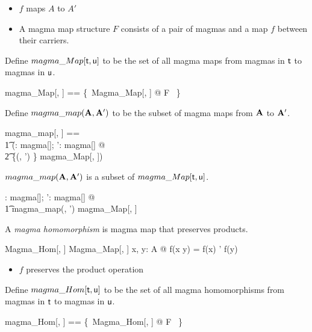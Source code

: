 \documentclass{amsart}
\begin{document}
\begin{itemize}
	\item $f$ maps $A$ to $A'$
	\item A magma map structure $F$ consists of a pair of magmas and a map $f$ between their carriers.
\end{itemize}

Define $magma\_Map[\mathsf{t}, \mathsf{u}]$ to be the set of all magma maps
from magmas in $\mathsf{t}$ to magmas in $\mathsf{u}$.

\begin{zed}
	magma\_Map[\genT, \genU] == \{~Magma\_Map[\genT, \genU] @ F ~\}
\end{zed}

Define $magma\_map(\mathbf{A}, \mathbf{A}')$ to be the subset of magma maps 
from $\mathbf{A}$ to $\mathbf{A}'$.

\begin{zed}
	magma\_map[\genT, \genU] == \\
	\t1	(\lambda \strucA: magma[\genT]; \strucA': magma[\genU] @ \\
	\t2		\{(\strucA, \strucA') \} \dres magma\_Map[\genT, \genU])
\end{zed}

\begin{remark} $magma\_map(\mathbf{A}, \mathbf{A}')$ is a subset of $magma\_Map[\mathsf{t}, \mathsf{u}]$.

\begin{zed}
	\forall \strucA: magma[\setT]; \strucA': magma[\setU] @ \\
	\t1	magma\_map(\strucA, \strucA') \subseteq magma\_Map[\setT, \setU]
\end{zed}

\end{remark}

A \textit{magma homomorphism} is magma map that preserves products.

\begin{schema}{Magma\_Hom}[\genT, \genU]
	Magma\_Map[\genT, \genU]
\where
	\forall x, y: A @ f(x \opG y) = f(x) \opG' f(y)
\end{schema}

\begin{itemize}
	\item $f$ preserves the product operation
\end{itemize}

Define $magma\_Hom[\mathsf{t}, \mathsf{u}]$ to be the set of all magma homomorphisms
from magmas in $\mathsf{t}$ to magmas in $\mathsf{u}$.

\begin{zed}
	magma\_Hom[\genT, \genU] == \{~Magma\_Hom[\genT, \genU] @ F ~\}
\end{zed}
\end{document}
